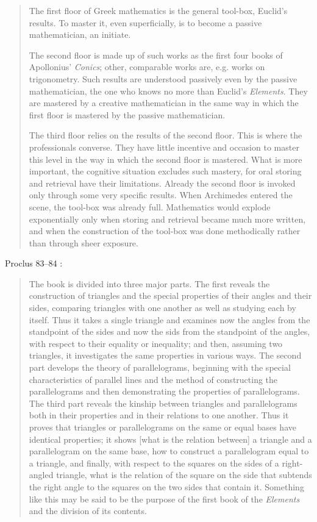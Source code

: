 \documentclass{article}
\begin{document}
\begin{quote}
The first floor of Greek mathematics is the general tool-box,
Euclid's results. To master it, even superficially, is to become a passive
mathematician, an initiate.

The second floor is made up of such works as the first four books of
Apollonius' {\em Conics}; other, comparable works are, e.g. works on trigonometry.
Such results are understood passively even by the passive
mathematician, the one who knows no more than Euclid's {\em Elements}.
They are mastered by a creative mathematician in the same way in
which the first floor is mastered by the passive mathematician.

The third floor relies on the results of the second floor. This is
where the professionals converse. They have little incentive and occasion
to master this level in the way in which the second floor is mastered.
What is more important, the cognitive situation excludes such
mastery, for oral storing and retrieval have their limitations. Already
the second floor is invoked only through some very specific results.
When Archimedes entered the scene, the tool-box was already full.
Mathematics would explode exponentially only when storing and retrieval
became much more written, and when the construction of the
tool-box was done methodically rather than through sheer exposure.
\end{quote}

Proclus 83--84 \cite[pp.~68--69]{proclus}:

\begin{quote}
The book is divided into three major parts. The first reveals
the construction of triangles and the special properties of their
angles and their sides, comparing triangles with one another
as well as studying each by itself. Thus it takes a single triangle
and examines now the angles from the standpoint of the sides
and now the sids from the standpoint of the angles, with 
respect to their equality or inequality; and then, assuming two
triangles, it investigates the same properties in various ways.
The second part develops the theory of parallelograms, beginning
with the special characteristics of parallel lines and
the method of constructing the parallelograms and then
demonstrating the properties of parallelograms. The third part
reveals the kinship between triangles and parallelograms both
in their properties and in their relations to one another. Thus
it proves that triangles or parallelograms on the same or equal
bases have identical properties; it shows [what is the relation
between] a triangle and a parallelogram on the same base,
how to construct a parallelogram equal to a triangle, and
finally, with respect to the squares on the sides of a right-angled
triangle, what is the relation of the square on the side
that subtends the right angle to the squares on the two sides
that contain it. Something like this may be said to be the
purpose of the first book of the {\em Elements} and the division 
of its contents.
\end{quote}
\end{document}
